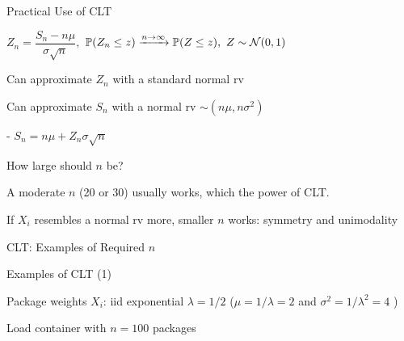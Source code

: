 \begin{frame}{Practical Use of CLT}

$Z_n = \dfrac{S_n - n\mu}{\sigma \sqrt{n}},$ \hspace{1cm} $\mathbb{P}( Z_n \le z ) \xrightarrow{n \rightarrow \infty} \mathbb{P}( Z \le z ), \ Z \sim \mathcal N(0,1)$

\plitemsep 0.1in
\bci
\item<2-> Can approximate $Z_n$ with a standard normal rv
\item<4-> Can approximate $S_n$ with a normal rv $\sim  (n\mu, n\sigma^2)$

- $S_n = n \mu + Z_n\sigma\sqrt{n}$
\item<5-> How large should $n$ be?
\bci
\item<6-> A moderate $n$ (20 or 30) usually works, which the power of CLT.

\item<7-> If $X_i$ resembles a normal rv more, smaller $n$ works: symmetry and unimodality\footnotemark
{}
\eci
\eci


\end{frame}


\begin{frame}{CLT: Examples of Required $n$}

\centering
{}


\end{frame}

\begin{frame}{Examples of CLT (1)}


\plitemsep 0.1in
\bci
\item Package weights $X_i$: iid exponential $\lambda=1/2$ ($\mu = 1/\lambda = 2$ and $\sigma^2 = 1/\lambda^2 = 4$ )

\item<2-> Load container with $n = 100$ packages

\eci

\end{frame}

